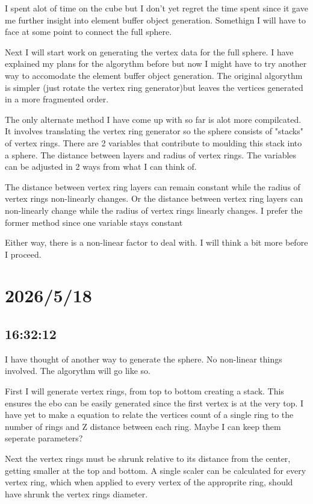 \documentclass{article}
\begin{document}
I spent alot of time on the cube but I don't yet regret the time spent since it gave me further 
insight into element buffer object generation. Somethign I will have to face at some point to connect 
the full sphere.

Next I will start work on generating the vertex data for the full sphere. I have explained my plans
for the algorythm before but now I might have to try another way to accomodate the element buffer object
generation. The original algorythm is simpler (just rotate the vertex ring generator)but leaves the 
vertices generated in a more fragmented order. 

The only alternate method I have come up with so far is alot more compilcated. It involves translating
the vertex ring generator so the sphere consists of "stacks" of vertex rings. There are 2 variables
that contribute to moulding this stack into a sphere. The distance between layers and radius of vertex
rings. The variables can be adjusted in 2 ways from what I can think of.

The distance between vertex ring layers can remain constant while the radius of vertex rings non-linearly
changes. Or the distance between vertex ring layers can non-linearly change while the radius of 
vertex rings linearly changes. I prefer the former method since one variable stays constant

Either way, there is a non-linear factor to deal with. I will think a bit more before I proceed.

\section*{2026/5/18}
\subsection*{16:32:12}
I have thought of another way to generate the sphere. No non-linear things involved. The algorythm will
go like so.

First I will generate vertex rings, from top to bottom creating a stack. This ensures the ebo can
be easily generated since the first vertex is at the very top. I have yet to make a equation to relate
the vertices count of a  single ring to the number of rings and Z distance between each ring. Maybe I
can keep them seperate parameters?

Next the vertex rings must be shrunk relative to its distance from the center, getting smaller at the
top and bottom. A single scaler can be calculated for every vertex ring, which when applied to every 
vertex of the approprite ring, should have shrunk the vertex rings diameter. 
\end{document}
